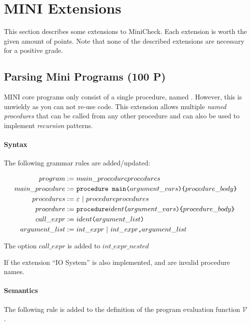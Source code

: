 \documentclass{article}
\newcommand\inParens[1]{\texttt{(}#1\texttt{)}}
\newcommand\inBraces[1]{\texttt{\{}#1\texttt{\}}}
\newcommand\comma{\texttt{,}}
\begin{document}
\section{MINI Extensions}
This section describes some extensions to MiniCheck. Each extension is worth the given amount of points. 
Note that none of the described extensions are necessary for a positive grade.

\subsection{Parsing Mini Programs (100 P)}

MINI core programs only consist of a single procedure, named . However, this is unwieldy as you can not re-use code.
This extension allows multiple \textit{named procedures} that can be called from any other procedure and can also be used to implement \textit{recursion} patterns.

\paragraph{Syntax}

The following grammar rules are added/updated:


\begin{align}
program :=& \ main\_procedure\space procedures \\
main\_procedure :=& \ \texttt{procedure main}\inParens{argument\_vars} \inBraces{procedure\_body} \\
procedures :=& \ \varepsilon \ | \ procedure \space procedures \\
procedure :=& \ \texttt{procedure}\space ident\inParens{argument\_vars} \inBraces{procedure\_body} \\
call\_expr :=& \ ident\inParens{argument\_list} \\
argument\_list :=& \ int\_expr \ | \ int\_expr\comma argument\_list
\end{align}


The option $call\_expr$ is added to $int\_expr\_nested$

If the extension ``IO System'' is also implemented,  and  are invalid procedure names.

\paragraph{Semantics}

The following rule is added to the definition of the program evaluation function $\mathcal{V}$.
\end{document}
